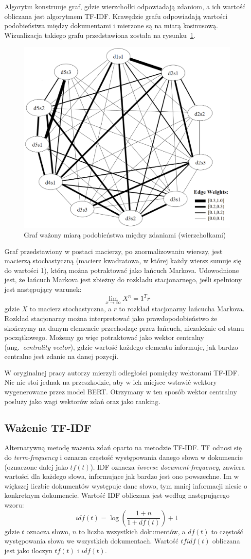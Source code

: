 		Algorytm konstruuje graf, gdzie wierzchołki odpowiadają zdaniom, a ich wartość obliczana jest algorytmem TF-IDF\@.
		Krawędzie grafu odpowiadają wartości podobieństwa między dokumentami i mierzone są na miarą kosinusową.
		Wizualizacja takiego grafu przedstawiona została na rysunku~\ref{fig:lexrank}.
		\begin{figure}[ht]
			\centering
			\includegraphics[width=0.5\linewidth]{rys03/lexrank.png}
			\caption[Graf ważony miarą podobieństwa między zdaniami]{Graf ważony miarą podobieństwa między zdaniami (wierzchołkami)\cite{LexRank}}\label{fig:lexrank}
		\end{figure}
		Graf przedstawiony w postaci macierzy, po znormalizowaniu wierszy, jest macierzą stochastyczną
			(macierz kwadratowa, w której każdy wiersz sumuje się do wartości 1), którą można potraktować jako łańcuch Markova.
		Udowodnione jest, że łańcuch Markova jest zbieżny do rozkładu stacjonarnego, jeśli spełniony jest następujący warunek:
		\[\lim_{x \to \infty}X^n = 1^T r\]
		gdzie \(X\) to macierz stochastyczna, a \(r\) to rozkład stacjonarny łańcucha Markova.
		Rozkład stacjonarny można interpretować jako prawdopodobieństwo że skończymy na danym elemencie przechodząc przez łańcuch, niezależnie od stanu początkowego.
		Możemy go więc potraktować jako wektor centralny (ang.\ \emph{centrality vector}),
			gdzie wartość każdego elementu informuje, jak bardzo centralne jest zdanie na danej pozycji.

		W oryginalnej pracy autorzy mierzyli odległości pomiędzy wektorami TF-IDF\@.
		Nic nie stoi jednak na przeszkodzie, aby w ich miejsce wstawić wektory wygenerowane przez model BERT\@.
		Otrzymany w ten sposób wektor centralny posłuży jako wagi wektorów zdań oraz jako ranking.

	\subsection{Ważenie TF-IDF}
		Alternatywną metodę ważenia zdań oparto na metodzie TF-IDF\@.
		TF odnosi się do \emph{term-frequency} i oznacza częstość występowania danego słowa w dokumencie (oznaczone dalej jako \(tf(t)\)).
		IDF oznacza \emph{inverse document-frequency}, zawiera wartości dla każdego słowa, informujące jak bardzo jest ono powszechne.
		Im w większej liczbie dokumentów występuje dane słowo, tym mniej informacji niesie o konkretnym dokumencie.
		Wartość IDF obliczana jest według następującego wzoru:
		\[idf(t)=\log\left(\frac{1+n}{1+df(t)}\right) + 1\]
		gdzie \(t\) oznacza słowo, \(n\) to liczba wszystkich dokumentów, a \(df(t)\) to częstość występowania słowa we wszystkich dokumentach.
		Wartość \(tfidf(t)\) obliczana jest jako iloczyn \(tf(t)\) i \(idf(t)\)\cite{TFIDF}.
		
